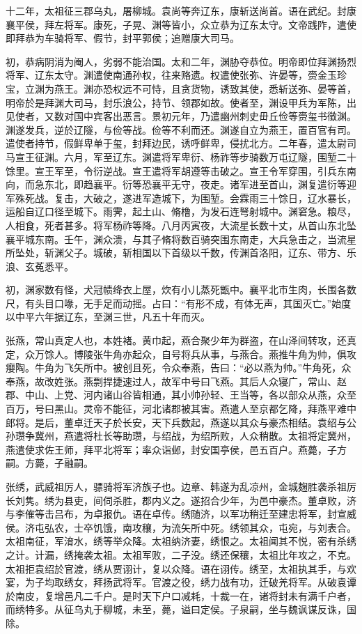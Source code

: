 \documentclass[12pt,UTF8]{ctexbook}
\begin{document}
十二年，太祖征三郡乌丸，屠柳城。袁尚等奔辽东，康斩送尚首。语在武纪。封康襄平侯，拜左将军。康死，子晃、渊等皆小，众立恭为辽东太守。文帝践阼，遣使即拜恭为车骑将军、假节，封平郭侯；追赠康大司马。

初，恭病阴消为阉人，劣弱不能治国。太和二年，渊胁夺恭位。明帝即位拜渊扬烈将军、辽东太守。渊遣使南通孙权，往来赂遗。权遣使张弥、许晏等，赍金玉珍宝，立渊为燕王。渊亦恐权远不可恃，且贪货物，诱致其使，悉斩送弥、晏等首，明帝於是拜渊大司马，封乐浪公，持节、领郡如故。使者至，渊设甲兵为军陈，出见使者，又数对国中宾客出恶言。景初元年，乃遣幽州刺史毌丘俭等赍玺书徵渊。渊遂发兵，逆於辽隧，与俭等战。俭等不利而还。渊遂自立为燕王，置百官有司。遣使者持节，假鲜卑单于玺，封拜边民，诱呼鲜卑，侵扰北方。二年春，遣太尉司马宣王征渊。六月，军至辽东。渊遣将军卑衍、杨祚等步骑数万屯辽隧，围堑二十馀里。宣王军至，令衍逆战。宣王遣将军胡遵等击破之。宣王令军穿围，引兵东南向，而急东北，即趋襄平。衍等恐襄平无守，夜走。诸军进至首山，渊复遣衍等迎军殊死战。复击，大破之，遂进军造城下，为围堑。会霖雨三十馀日，辽水暴长，运船自辽口径至城下。雨霁，起土山、脩橹，为发石连弩射城中。渊窘急。粮尽，人相食，死者甚多。将军杨祚等降。八月丙寅夜，大流星长数十丈，从首山东北坠襄平城东南。壬午，渊众溃，与其子脩将数百骑突围东南走，大兵急击之，当流星所坠处，斩渊父子。城破，斩相国以下首级以千数，传渊首洛阳，辽东、带方、乐浪、玄菟悉平。

初，渊家数有怪，犬冠帻绛衣上屋，炊有小儿蒸死甑中。襄平北巿生肉，长围各数尺，有头目口喙，无手足而动摇。占曰：“有形不成，有体无声，其国灭亡。”始度以中平六年据辽东，至渊三世，凡五十年而灭。

张燕，常山真定人也，本姓褚。黄巾起，燕合聚少年为群盗，在山泽间转攻，还真定，众万馀人。博陵张牛角亦起众，自号将兵从事，与燕合。燕推牛角为帅，俱攻癭陶。牛角为飞矢所中。被创且死，令众奉燕，告曰：“必以燕为帅。”牛角死，众奉燕，故改姓张。燕剽捍捷速过人，故军中号曰飞燕。其后人众寝广，常山、赵郡、中山、上党、河内诸山谷皆相通，其小帅孙轻、王当等，各以部众从燕，众至百万，号曰黑山。灵帝不能征，河北诸郡被其害。燕遣人至京都乞降，拜燕平难中郎将。是后，董卓迁天子於长安，天下兵数起，燕遂以其众与豪杰相结。袁绍与公孙瓒争冀州，燕遣将杜长等助瓒，与绍战，为绍所败，人众稍散。太祖将定冀州，燕遣使求佐王师，拜平北将军；率众诣邺，封安国亭侯，邑五百户。燕薨，子方嗣。方薨，子融嗣。

张绣，武威祖厉人，骠骑将军济族子也。边章、韩遂为乱凉州，金城麹胜袭杀祖厉长刘隽。绣为县吏，间伺杀胜，郡内义之。遂招合少年，为邑中豪杰。董卓败，济与李傕等击吕布，为卓报仇。语在卓传。绣随济，以军功稍迁至建忠将军，封宣威侯。济屯弘农，士卒饥饿，南攻穰，为流矢所中死。绣领其众，屯宛，与刘表合。太祖南征，军淯水，绣等举众降。太祖纳济妻，绣恨之。太祖闻其不悦，密有杀绣之计。计漏，绣掩袭太祖。太祖军败，二子没。绣还保穰，太祖比年攻之，不克。太祖拒袁绍於官渡，绣从贾诩计，复以众降。语在诩传。绣至，太祖执其手，与欢宴，为子均取绣女，拜扬武将军。官渡之役，绣力战有功，迁破羌将军。从破袁谭於南皮，复增邑凡二千户。是时天下户口减耗，十裁一在，诸将封未有满千户者，而绣特多。从征乌丸于柳城，未至，薨，谥曰定侯。子泉嗣，坐与魏讽谋反诛，国除。
\end{document}
